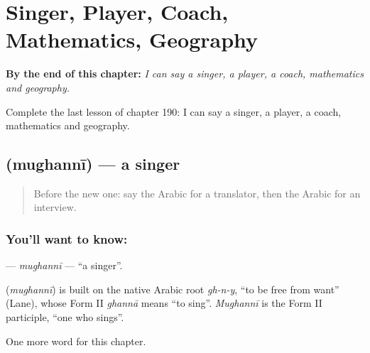 
\chapter{Singer, Player, Coach, Mathematics, Geography}
\label{ch:ar-singer-player-coach-mathematics-geography}

\begin{chapteropening}
\textbf{By the end of this chapter:} \emph{I can say a singer, a player, a coach, mathematics and geography.}

Complete the last lesson of chapter 190: I can say a singer, a player, a coach, mathematics and geography.
\end{chapteropening}

\section[\texorpdfstring{\ar{مغني} (mughannī)}{مغني (mughannī)}]{ (mughannī) — a singer}

\label{lesson:AR-C190-mughanni}



\begin{quote}
Before the new one: say the Arabic for a translator, then the Arabic for an interview.
\end{quote}

\subsection*{You'll want to know: }
\textbf{} — \emph{mughannī} — \textquotedblleft{}a singer\textquotedblright{}.

\begin{cousinweb}
\textbf{} (\emph{mughannī}) is built on the native Arabic root \emph{gh-n-y}, \textquotedblleft{}to be free from want\textquotedblright{} (Lane), whose Form II \emph{ghannā} means \textquotedblleft{}to sing\textquotedblright{}. \emph{Mughannī} is the Form II participle, \textquotedblleft{}one who sings\textquotedblright{}.
\end{cousinweb}

\begin{grammarlens}[title={What you've built}]
One more word for this chapter.
\end{grammarlens}

